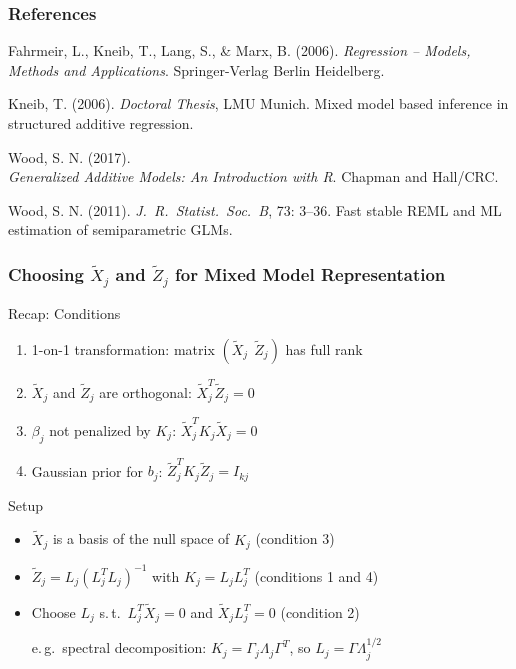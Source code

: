 \documentclass[final]{beamer}
\begin{document}
\appendix
\begin{frame}
\frametitle{References}
				\begin{thebibliography}{10}
				
Fahrmeir, L., Kneib, T., Lang, S., \&  Marx, B. (2006). {\em Regression -- Models, Methods and Applications}.
\newblock Springer-Verlag Berlin Heidelberg.

Kneib, T. (2006). {\em Doctoral Thesis}, LMU Munich.
\newblock Mixed model based inference in structured additive regression.

Wood, S. N. (2017). \\ {\em Generalized Additive Models: An Introduction with R}.
\newblock Chapman and Hall/CRC.

Wood, S. N. (2011). {\em J.\ R.\ Statist.\ Soc.\ B}, 73: 3--36.
\newblock Fast stable REML and ML estimation of semiparametric GLMs.

\end{thebibliography}
\end{frame}



\begin{frame}
\frametitle{Choosing $\tilde{X}_j$ and $\tilde{Z}_j$ for Mixed Model Representation}

\begin{block}{\small Recap: Conditions}
\small
\begin{enumerate}
\itemsep0em 
\item 1-on-1 transformation: matrix $(\tilde{X}_j \:\:  \tilde{Z}_j)$ has full rank
\item $\tilde{X}_j$ and $\tilde{Z}_j$ are orthogonal: $\tilde{X}_j^T \tilde{Z}_j = 0$
\item $\beta_j$ not penalized by $K_j$: $\tilde{X}_j^T K_j \tilde{X}_j = 0$
\item Gaussian prior for $b_j$: $\tilde{Z}_j^T K_j \tilde{Z}_j = I_{kj}$
\end{enumerate}
\end{block}
\vspace{-1em}
\begin{block}{Setup}
\begin{itemize}
\item $\tilde{X}_j$ is a basis of the null space of $K_j$ (condition 3)
\item $\tilde{Z}_j =L_j (L_j^T L_j)^{-1}$ with $K_j =L_j L_j^T$ (conditions 1 and 4)
\item Choose $L_j$ s.\,t.\ $L_j^T\tilde{X}_j = 0$ and $\tilde{X}_jL_j^T = 0$ (condition 2)

e.\,g.\ spectral decomposition: 
$K_j = \Gamma_j \Lambda_j \Gamma^T$, so $L_j = \Gamma \Lambda_j^{1/2}$
\end{itemize}
\end{block}

\end{frame}
\end{document}

